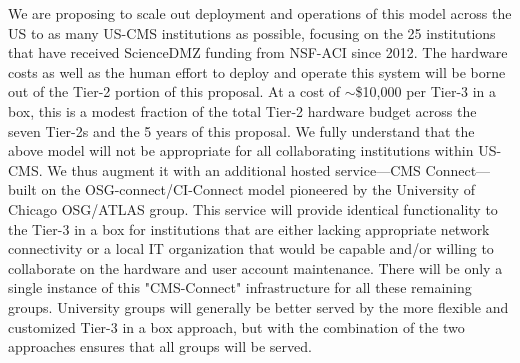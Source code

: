 \documentclass[11pt,a4paper]{article}
\begin{document}
We are proposing to scale out deployment and operations of this model across the US to as many US-CMS institutions as possible, focusing on the 25 institutions that have received ScienceDMZ funding from NSF-ACI since 2012. The hardware costs as well as the human effort to deploy and operate this system will be borne out of the Tier-2 portion of this proposal.  At a cost of $\sim$\$10,000 per Tier-3 in a box, this is a modest fraction of the total Tier-2 hardware budget across the seven Tier-2s and the 5 years of this proposal.  We fully understand that the above model will not be appropriate for all collaborating institutions within US-CMS. We thus augment it with an additional hosted service---CMS Connect---built on the OSG-connect/CI-Connect model pioneered by the University of Chicago OSG/ATLAS group.  This service will provide identical functionality to the Tier-3 in a box for institutions that are either lacking appropriate network connectivity or a local IT organization that would be capable and/or willing to collaborate on the hardware and user account maintenance.  There will be only a single instance of this "CMS-Connect" infrastructure for all these remaining groups.  University groups will generally be better served by the more flexible and customized Tier-3 in a box approach, but with the combination of the two approaches ensures that all groups will be served.
\end{document}
